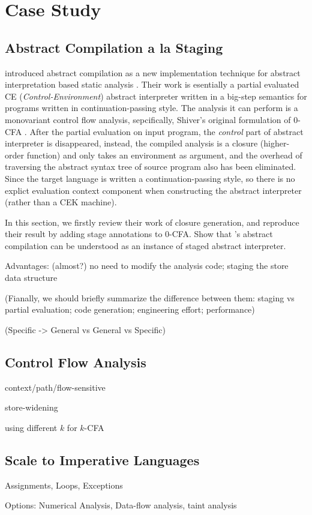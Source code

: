 \section{Case Study} \label{cases_study}

\subsection{Abstract Compilation a la Staging}

\citeauthor{Boucher:1996:ACN:647473.727587} introduced abstract compilation as a new
implementation technique for abstract interpretation based static analysis \cite{Boucher:1996:ACN:647473.727587}.
Their work is esentially a partial evaluated CE (\textit{Control-Environment}) abstract
interpreter written in a big-step semantics for programs written in continuation-passing style.
The analysis it can perform is a monovariant control flow analysis, sepcifically, Shiver's original
formulation of 0-CFA \cite{Shivers:1991:SSC:115865.115884, Shivers:1988:CFA:53990.54007}.
After the partial evaluation on input program, the \textit{control} part of abstract interpreter
is disappeared, instead, the compiled analysis is a closure (higher-order function) and
only takes an environment as argument,
and the overhead of traversing the abstract syntax tree of source program also has been eliminated.
Since the target language is written a continuation-passing style, so there is
no explict evaluation context component when constructing the abstract interpreter
(rather than a CEK machine).

In this section, we firstly review their work of closure generation,
and reproduce their result by adding stage annotations to 0-CFA.
Show that \citeauthor{Boucher:1996:ACN:647473.727587}'s abstract compilation can be understood as an instance of staged 
abstract interpreter.

Advantages: (almost?) no need to modify the analysis code; staging the store data structure

(Fianally, we should briefly summarize the difference between them:
staging vs partial evaluation; code generation; engineering effort; performance)

(Specific -> General vs General vs Specific)

\subsection{Control Flow Analysis}

context/path/flow-sensitive

store-widening

using different $k$ for $k$-CFA

\subsection{Scale to Imperative Languages} \label{cases_imp}

Assignments, Loops, Exceptions

Options: Numerical Analysis, Data-flow analysis, taint analysis
